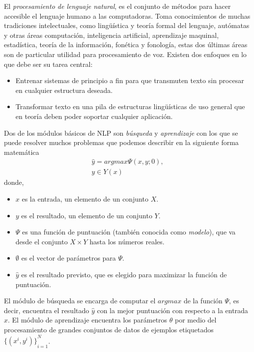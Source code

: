El \emph{procesamiento de lenguaje natural}, es el conjunto de métodos para hacer accesible el lenguaje humano a las computadoras\cite{eise19}. Toma conocimientos de muchas tradiciones intelectuales, como lingüística y teoría formal del lenguaje, autómatas y otras áreas computación, inteligencia artificial, aprendizaje maquinal, estadística, teoría de la información, fonética y fonología, estas dos últimas áreas son de particular utilidad para procesamiento de voz. Existen dos enfoques en lo que debe ser su tarea central: 
\begin{itemize}
	\item Entrenar sistemas de principio a fin para que transmuten texto sin procesar en cualquier estructura deseada.
	\item Transformar texto en una pila de estructuras lingüísticas de uso general que en teoría deben poder soportar cualquier aplicación.
\end{itemize}
Dos de los módulos básicos de NLP son \emph{búsqueda} y \emph{aprendizaje} con los que se puede resolver muchos problemas que podemos describir en la siguiente forma matemática
\begin{equation}
\begin{matrix}
\hat{y}=argmax\Psi(x,y;0),\\
y\in Y(x)
\end{matrix}
\end{equation}
donde,
\begin{itemize}
	\item $x$ es la entrada, un elemento de un conjunto $X$.
	\item $y$ es el resultado, un elemento de un conjunto $Y$.
	\item $\Psi$ es una función de puntuación (también conocida como \emph{modelo}), que va desde el conjunto $X\times Y$ hasta los números reales.
	\item $\emptyset$ es el vector de parámetros para $\Psi$.
	\item $\hat{y}$ es el resultado previsto, que es elegido para maximizar la función de puntuación.
\end{itemize}
El módulo de búsqueda se encarga de computar el $argmax$ de la función $\Psi$, es decir, encuentra el resultado $\hat{y}$ con la mejor puntuación con respecto a la entrada $x$. El módulo de aprendizaje encuentra los parámetros $\theta$ por medio del procesamiento de grandes conjuntos de datos de ejemplos etiquetados ${\{(x^i,y^i)\}}_{i=1}^{N}$.